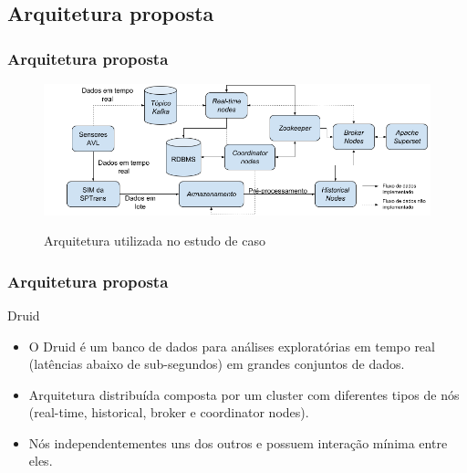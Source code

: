 \documentclass{beamer}
\begin{document}
\subsection{Arquitetura proposta}
\begin{frame}
\frametitle{Arquitetura proposta}
\begin{figure}[!htb]%
	\centering
 	  \caption{Arquitetura utilizada no estudo de caso}
		\includegraphics[width=1\linewidth]{viz_arch_pt.png}
	\label{fig:viz_arch}
\end{figure}
\end{frame}
\begin{frame}
\frametitle{Arquitetura proposta}
\begin{block}{Druid}
\begin{itemize}
    \item O Druid é um banco de dados para análises exploratórias em tempo real (latências abaixo de sub-segundos) em grandes conjuntos de dados.
    \item Arquitetura distribuída composta por um cluster com diferentes tipos de nós (real-time, historical, broker e coordinator nodes).
    \item Nós independentementes uns dos outros e possuem interação mínima entre eles. 
\end{itemize}
\end{block}
\end{frame}
\end{document}
